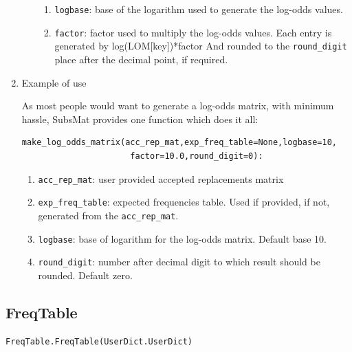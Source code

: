 \documentclass{report}
\begin{document}
\begin{enumerate}
\begin{enumerate}
\begin{enumerate}
     \item \verb|logbase|: base of the logarithm used to generate the log-odds values.

     \item \verb|factor|: factor used to multiply the log-odds values.  Each entry is generated by log(LOM[key])*factor And rounded to the \verb|round_digit| place after the decimal point, if required.

\end{enumerate}

\end{enumerate}

\item Example of use

As most people would want to generate a log-odds matrix, with minimum hassle, SubsMat provides one function which does it all:

\begin{verbatim}
make_log_odds_matrix(acc_rep_mat,exp_freq_table=None,logbase=10,
                      factor=10.0,round_digit=0):
\end{verbatim}

\begin{enumerate}
  \item \verb|acc_rep_mat|: user provided accepted replacements matrix
  \item \verb|exp_freq_table|: expected frequencies table. Used if provided, if not, generated from the \verb|acc_rep_mat|.
  \item \verb|logbase|: base of logarithm for the log-odds matrix. Default base 10.
  \item \verb|round_digit|: number after decimal digit to which result should be rounded. Default zero.
\end{enumerate}

\end{enumerate}

\subsection{FreqTable}
\label{sec:freq_table}

\begin{verbatim}
FreqTable.FreqTable(UserDict.UserDict)
\end{verbatim}
\end{document}
